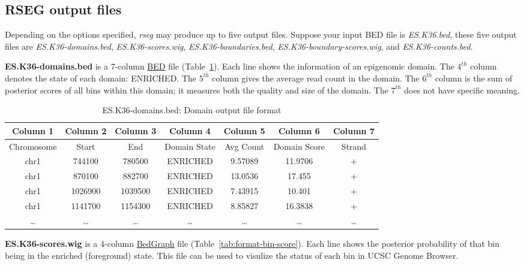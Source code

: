 \documentclass[11pt]{report}
\begin{document}
\subsection{RSEG output files}
\label{sec:rseg-output}

Depending on the options specified, \textit{rseg} may produce up to five output
files. Suppose your input BED file is \textit{ES.K36.bed}, these five output
files are \textit{ES.K36-domains.bed}, \textit{ES.K36-scores.wig},
\textit{ES.K36-boundaries.bed}, \textit{ES.K36-boundary-scores.wig},
and \textit{ES.K36-counts.bed}.

\textbf{ES.K36-domains.bed} is a 7-column
\href{http://genome.ucsc.edu/FAQ/FAQformat.html#format1}{BED} file
(Table~\ref{tab:format-domain}). Each line shows the information of an
epigenomic domain. The $4^{th}$ column denotes the state of each
domain: ENRICHED.  The $5^{th}$ column gives the average read count in
the domain. The $6^{th}$ column is the sum of posterior scores of all
bins within this domain; it measures both the quality and size of the
domain. The $7^{th}$ does not have specific meaning.

\begin{table}[th]
  \centering
  \begin{tabular}{c c c c c c c}
Column 1 & Column 2 & Column 3 &  Column 4 & Column 5 &  Column 6  &
Column 7 \\
\hline
Chromosome  & Start & End & Domain State &  Avg Count & Domain Score &  Strand \\
\hline
chr1 &   744100  &780500  &ENRICHED        &9.57089 &11.9706 &+ \\
chr1 &   870100  &882700  &ENRICHED        &13.0536 &17.455  &+ \\
chr1 &   1026900 &1039500 &ENRICHED        &7.43915 &10.401  &+ \\
chr1 &   1141700 &1154300 &ENRICHED        &8.85827 &16.3838 &+ \\
\ldots & \ldots &\ldots &\ldots &\ldots &\ldots & \ldots\\ 
\hline
  \end{tabular}
  \caption{ES.K36-domains.bed: Domain output file format}
  \label{tab:format-domain}
\end{table}

\textbf{ES.K36-scores.wig} is a 4-column
\href{http://genome.ucsc.edu/goldenPath/help/bedgraph.html}{BedGraph}
file (Table~\ref{tab:format-bin-score}). Each line shows the posterior
probability of that bin being in the enriched (foreground) state. This
file can be used to visulize the status of each bin in UCSC Genome
Browser.
\end{document}
